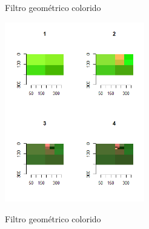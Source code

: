 \documentclass[
  ignorenonframetext,
]{beamer}
\newenvironment{Shaded}{\begin{snugshade}}{\end{snugshade}}
\newcommand{\ControlFlowTok}[1]{\textcolor[rgb]{0.13,0.29,0.53}{\textbf{#1}}}
\newcommand{\DecValTok}[1]{\textcolor[rgb]{0.00,0.00,0.81}{#1}}
\newcommand{\KeywordTok}[1]{\textcolor[rgb]{0.13,0.29,0.53}{\textbf{#1}}}
\newcommand{\NormalTok}[1]{#1}
\newcommand{\OperatorTok}[1]{\textcolor[rgb]{0.81,0.36,0.00}{\textbf{#1}}}
\newcommand{\StringTok}[1]{\textcolor[rgb]{0.31,0.60,0.02}{#1}}
\begin{document}
\begin{frame}[fragile]{Filtro geométrico colorido}
\protect\hypertarget{filtro-geomuxe9trico-colorido-1}{}

\small

\begin{Shaded}
\end{Shaded}

\includegraphics[width=2.4in]{IMAGENS/plote}

\begin{center}
\tiny{}
\end{center}

\end{frame}

\begin{frame}[fragile]{Filtro geométrico colorido}
\protect\hypertarget{filtro-geomuxe9trico-colorido-2}{}

\small

\begin{Shaded}
\end{Shaded}

\end{frame}
\end{document}
